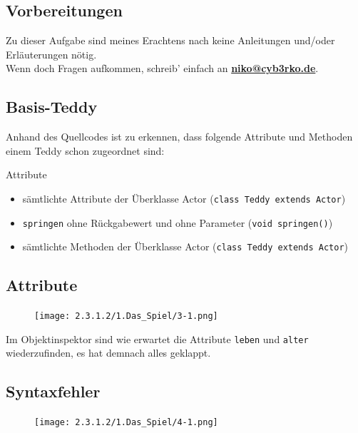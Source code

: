 \documentclass{scrartcl}   %
\begin{document}
\subsection{Vorbereitungen}

Zu dieser Aufgabe sind meines Erachtens nach keine Anleitungen und/oder Erläuterungen nötig.\\
Wenn doch Fragen aufkommen, schreib' einfach an \textbf{\href{mailto:niko@cyb3rko.de}{niko@cyb3rko.de}}.

\subsection{Basis-Teddy}

Anhand des Quellcodes ist zu erkennen, dass folgende Attribute und Methoden einem Teddy schon zugeordnet sind:

\begin{itemize}
    \barrow Attribute
    \begin{itemize}
    \item sämtlichte Attribute der Überklasse Actor (\texttt{class Teddy extends Actor})
    \end{itemize}
    \begin{itemize}
    \item \texttt{springen} ohne Rückgabewert und ohne Parameter (\texttt{void springen()})
    \item sämtlichte Methoden der Überklasse Actor (\texttt{class Teddy extends Actor})
    \end{itemize}
\end{itemize}

\subsection{Attribute}

\begin{figure}[ht]
	\centering
	\texttt{[image: 2.3.1.2/1.Das\_Spiel/3-1.png]}
\end{figure}

Im Objektinspektor sind wie erwartet die Attribute \texttt{leben} und \texttt{alter} wiederzufinden, es hat demnach alles geklappt.

\newpage

\subsection{Syntaxfehler}

\begin{figure}[ht]
	\centering
	\texttt{[image: 2.3.1.2/1.Das\_Spiel/4-1.png]}
\end{figure}
\end{document}
